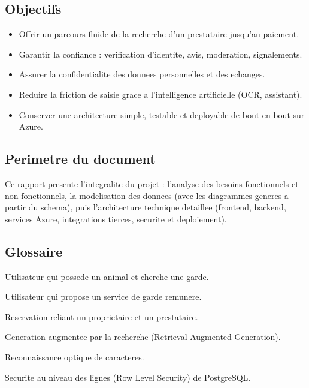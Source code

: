 \documentclass[11pt,a4paper]{article}
\begin{document}
\subsection{Objectifs}
\begin{itemize}[leftmargin=1.4em]
  \item Offrir un parcours fluide de la recherche d'un prestataire jusqu'au paiement.
  \item Garantir la confiance : verification d'identite, avis, moderation, signalements.
  \item Assurer la confidentialite des donnees personnelles et des echanges.
  \item Reduire la friction de saisie grace a l'intelligence artificielle (OCR, assistant).
  \item Conserver une architecture simple, testable et deployable de bout en bout sur Azure.
\end{itemize}

\subsection{Perimetre du document}
Ce rapport presente l'integralite du projet : l'analyse des besoins
fonctionnels et non fonctionnels, la modelisation des donnees (avec les
diagrammes generes a partir du schema), puis l'architecture technique detaillee
(frontend, backend, services Azure, integrations tierces, securite et
deploiement).

\subsection{Glossaire}
\begin{description}[leftmargin=2em,style=nextline]
  \item[Proprietaire] Utilisateur qui possede un animal et cherche une garde.
  \item[Prestataire] Utilisateur qui propose un service de garde remunere.
  \item[Offre de garde] Reservation reliant un proprietaire et un prestataire.
  \item[RAG] Generation augmentee par la recherche (Retrieval Augmented Generation).
  \item[OCR] Reconnaissance optique de caracteres.
  \item[RLS] Securite au niveau des lignes (Row Level Security) de PostgreSQL.
\end{description}

\end{document}
